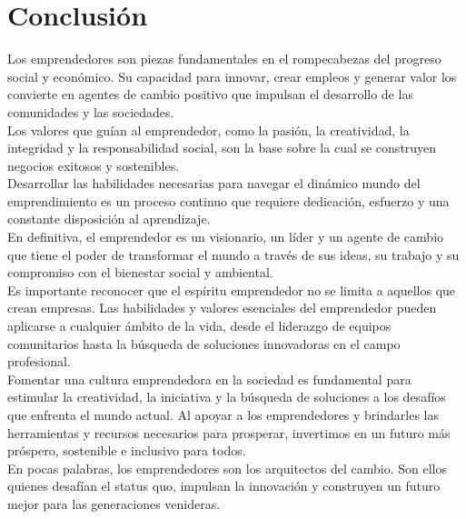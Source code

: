 \documentclass{article}
\begin{document}
\section{Conclusión}
Los emprendedores son piezas fundamentales en el rompecabezas del progreso social y económico. Su capacidad para innovar, crear empleos y generar valor los convierte en agentes de cambio positivo que impulsan el desarrollo de las comunidades y las sociedades.
\vspace{0.5cm}\\
Los valores que guían al emprendedor, como la pasión, la creatividad, la integridad y la responsabilidad social, son la base sobre la cual se construyen negocios exitosos y sostenibles.
\vspace{0.5cm}\\
Desarrollar las habilidades necesarias para navegar el dinámico mundo del emprendimiento es un proceso continuo que requiere dedicación, esfuerzo y una constante disposición al aprendizaje.
\vspace{0.5cm}\\
En definitiva, el emprendedor es un visionario, un líder y un agente de cambio que tiene el poder de transformar el mundo a través de sus ideas, su trabajo y su compromiso con el bienestar social y ambiental.
\vspace{0.5cm}\\
Es importante reconocer que el espíritu emprendedor no se limita a aquellos que crean empresas. Las habilidades y valores esenciales del emprendedor pueden aplicarse a cualquier ámbito de la vida, desde el liderazgo de equipos comunitarios hasta la búsqueda de soluciones innovadoras en el campo profesional.
\vspace{0.5cm}\\
Fomentar una cultura emprendedora en la sociedad es fundamental para estimular la creatividad, la iniciativa y la búsqueda de soluciones a los desafíos que enfrenta el mundo actual. Al apoyar a los emprendedores y brindarles las herramientas y recursos necesarios para prosperar, invertimos en un futuro más próspero, sostenible e inclusivo para todos.
\vspace{0.5cm}\\
En pocas palabras, los emprendedores son los arquitectos del cambio. Son ellos quienes desafían el status quo, impulsan la innovación y construyen un futuro mejor para las generaciones venideras.

\newpage
\end{document}
